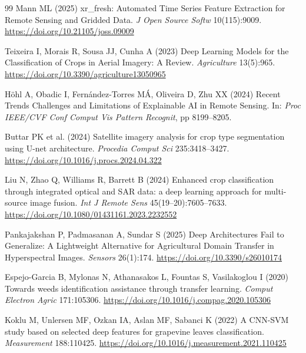 \documentclass[pdflatex,sn-mathphys]{sn-jnl} %
\begin{document}
\begin{thebibliography}{99}
Mann ML (2025) xr\_fresh: Automated Time Series Feature Extraction for Remote Sensing and Gridded Data. \textit{J Open Source Softw} 10(115):9009. \href{https://doi.org/10.21105/joss.09009}{https://doi.org/10.21105/joss.09009}

Teixeira I, Morais R, Sousa JJ, Cunha A (2023) Deep Learning Models for the Classification of Crops in Aerial Imagery: A Review. \textit{Agriculture} 13(5):965. \href{https://doi.org/10.3390/agriculture13050965}{https://doi.org/10.3390/agriculture13050965}

Höhl A, Obadic I, Fernández-Torres MÁ, Oliveira D, Zhu XX (2024) Recent Trends Challenges and Limitations of Explainable AI in Remote Sensing. In: \textit{Proc IEEE/CVF Conf Comput Vis Pattern Recognit}, pp 8199--8205.

Buttar PK et al. (2024) Satellite imagery analysis for crop type segmentation using U-net architecture. \textit{Procedia Comput Sci} 235:3418--3427. \href{https://doi.org/10.1016/j.procs.2024.04.322}{https://doi.org/10.1016/j.procs.2024.04.322}

Liu N, Zhao Q, Williams R, Barrett B (2024) Enhanced crop classification through integrated optical and SAR data: a deep learning approach for multi-source image fusion. \textit{Int J Remote Sens} 45(19--20):7605--7633. \href{https://doi.org/10.1080/01431161.2023.2232552}{https://doi.org/10.1080/01431161.2023.2232552}

Pankajakshan P, Padmasanan A, Sundar S (2025) Deep Architectures Fail to Generalize: A Lightweight Alternative for Agricultural Domain Transfer in Hyperspectral Images. \textit{Sensors} 26(1):174. \href{https://doi.org/10.3390/s26010174}{https://doi.org/10.3390/s26010174}

Espejo-Garcia B, Mylonas N, Athanasakos L, Fountas S, Vasilakoglou I (2020) Towards weeds identification assistance through transfer learning. \textit{Comput Electron Agric} 171:105306. \href{https://doi.org/10.1016/j.compag.2020.105306}{https://doi.org/10.1016/j.compag.2020.105306}

Koklu M, Unlersen MF, Ozkan IA, Aslan MF, Sabanci K (2022) A CNN-SVM study based on selected deep features for grapevine leaves classification. \textit{Measurement} 188:110425. \href{https://doi.org/10.1016/j.measurement.2021.110425}{https://doi.org/10.1016/j.measurement.2021.110425}


\end{thebibliography}
\end{document}
